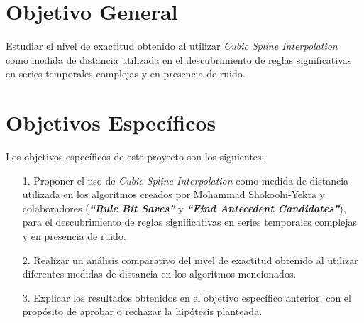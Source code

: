 \section{\textbf{Objetivo General}}
Estudiar el nivel de exactitud obtenido al utilizar \textit{Cubic Spline Interpolation} como medida de distancia utilizada en el descubrimiento de reglas significativas en series temporales complejas y en presencia de ruido.
\section{\textbf{Objetivos Espec\'ificos}}
Los objetivos espec\'ificos de este proyecto son los siguientes:
\begin{itemize}
\item [1.] Proponer el uso de \textit{Cubic Spline Interpolation} como medida de distancia utilizada en los algoritmos creados por Mohammad Shokoohi-Yekta y colaboradores (\textit{\textbf{\enquote{Rule Bit Saves}}} y \textit{\textbf{\enquote{Find Antecedent Candidates}}}), para el descubrimiento de reglas significativas en series temporales complejas y en presencia de ruido.
	\item [2.] Realizar un an\'alisis comparativo del nivel de exactitud obtenido al utilizar diferentes medidas de distancia en los algoritmos mencionados.
\item [3.] Explicar los resultados obtenidos en el objetivo espec\'ifico anterior, con el prop\'osito de aprobar o rechazar la hip\'otesis planteada.
\end{itemize}